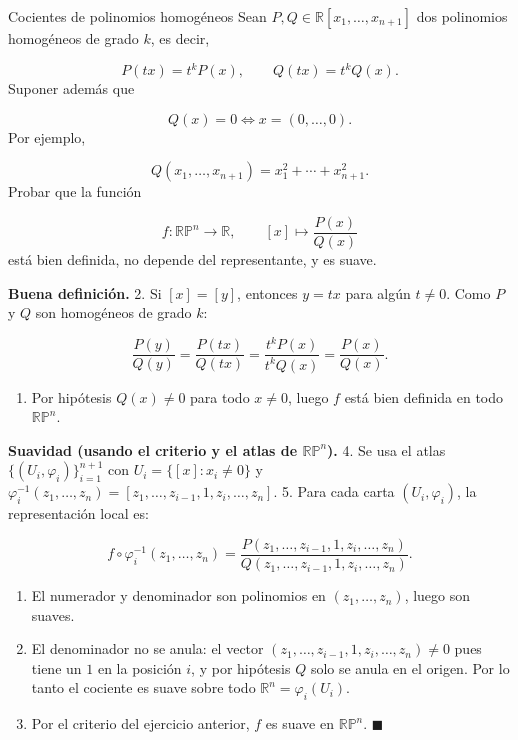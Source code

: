 \begin{bookexercise}{Cocientes de polinomios homogéneos}
Sean $P,Q\in\mathbb{R}[x_1,\dots,x_{n+1}]$ dos polinomios homogéneos de grado $k$, es decir,

\[
P(tx)=t^kP(x),\qquad Q(tx)=t^kQ(x).
\]
Suponer además que

\[
Q(x)=0 \iff x=(0,\dots,0).
\]
Por ejemplo,

\[
Q(x_1,\dots,x_{n+1})=x_1^2+\cdots+x_{n+1}^2.
\]
Probar que la función

\[
f:\mathbb{RP}^n\to\mathbb{R},\qquad [x]\mapsto \frac{P(x)}{Q(x)}
\]
está bien definida, no depende del representante, y es suave.

\end{bookexercise}
\begin{bookproof}{}
\textbf{Buena definición.} 2. Si $[x]=[y]$, entonces $y=tx$ para algún $t\neq 0$. Como $P$ y $Q$ son homogéneos de grado $k$:

\[
\frac{P(y)}{Q(y)}=\frac{P(tx)}{Q(tx)}=\frac{t^kP(x)}{t^kQ(x)}=\frac{P(x)}{Q(x)}.
\]
\begin{enumerate}[start=3]
\item Por hipótesis $Q(x)\neq 0$ para todo $x\neq 0$, luego $f$ está bien definida en todo $\mathbb{RP}^n$.
\end{enumerate}
\textbf{Suavidad (usando el criterio y el atlas de $\mathbb{RP}^n$).} 4. Se usa el atlas $\{(U_i,\varphi_i)\}_{i=1}^{n+1}$ con $U_i=\{[x]:x_i\neq 0\}$ y $\varphi_i^{-1}(z_1,\dots,z_n)=[z_1,\dots,z_{i-1},1,z_i,\dots,z_n]$. 5. Para cada carta $(U_i,\varphi_i)$, la representación local es:

\[
f\circ\varphi_i^{-1}(z_1,\dots,z_n)=\frac{P(z_1,\dots,z_{i-1},1,z_i,\dots,z_n)}{Q(z_1,\dots,z_{i-1},1,z_i,\dots,z_n)}.
\]
\begin{enumerate}[start=6]
\item El numerador y denominador son polinomios en $(z_1,\dots,z_n)$, luego son suaves.
\item El denominador no se anula: el vector $(z_1,\dots,z_{i-1},1,z_i,\dots,z_n)\neq 0$ pues tiene un $1$ en la posición $i$, y por hipótesis $Q$ solo se anula en el origen. Por lo tanto el cociente es suave sobre todo $\mathbb{R}^n=\varphi_i(U_i)$.
\item Por el criterio del ejercicio anterior, $f$ es suave en $\mathbb{RP}^n$. $\blacksquare$
\end{enumerate}
\bookqed
\end{bookproof}
